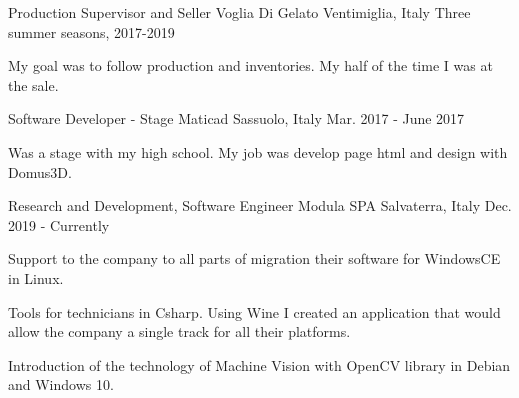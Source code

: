 

\begin{cventries}

  \cventry
    {Production Supervisor and Seller} %
    {Voglia Di Gelato} %
    {Ventimiglia, Italy} %
    {Three summer seasons, 2017-2019} %
    {
      \begin{cvitems} %
        \item {My goal was to follow production and inventories. My half of the time I was at the sale.}
      \end{cvitems}
    }

  \cventry
    {Software Developer - Stage} %
    {Maticad} %
    {Sassuolo, Italy} %
    {Mar. 2017 - June 2017} %
    {
      \begin{cvitems} %
        \item {Was a stage with my high school. My job was develop page html and design with Domus3D. }
      \end{cvitems}
    }

  \cventry
    {Research and Development, Software Engineer} %
    {Modula SPA} %
    {Salvaterra, Italy} %
    {Dec. 2019 - Currently} %
    {
      \begin{cvitems} %
        \item {Support to the company to all parts of migration their software for WindowsCE in Linux. }
        \item {Tools for technicians in Csharp. Using Wine I created an application that would allow the company a single track for all their platforms. }
        \item {Introduction of the technology of Machine Vision with OpenCV library in Debian and Windows 10. }
      \end{cvitems}
    }

\end{cventries}
